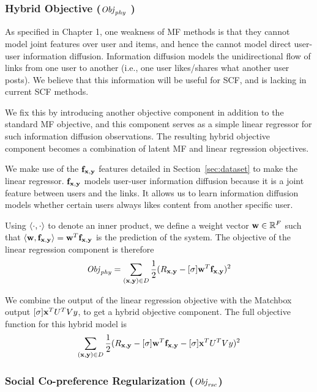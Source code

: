 \subsubsection{Hybrid Objective ($\mathit{Obj}_{\mathit{phy}}$ )}

As specified in Chapter 1, one weakness of MF methods is that they
cannot model joint features over user and items, and hence the cannot
model direct user-user information diffusion. Information diffusion
models the unidirectional flow of links from one user to another
(i.e., one user likes/shares what another user posts). We believe that
this information will be useful for SCF, and is lacking in current SCF
methods.

We fix this by introducing another objective component in addition to
the standard MF objective, and this component serves as a simple
linear regressor for such information diffusion observations. The
resulting hybrid objective component becomes a combination of latent
MF and linear regression objectives.

We make use of the $\mathbf{f}_{\mathbf{x},\mathbf{y}}$ features detailed in
Section~\ref{sec:dataset} to make the linear regressor. $\mathbf{f}_{\mathbf{x},\mathbf{y}}$
models user-user information diffusion because it is a joint feature
between users and the links. It allows us to learn information
diffusion models whether certain users always likes content from
another specific user.


Using $\langle \cdot,\cdot \rangle$ to denote an inner product, we define a
weight vector $\mathbf{w} \in \mathbb{R}^F$ such that $\langle \mathbf{w}, \mathbf{f}_{\mathbf{x},\mathbf{y}} \rangle = \mathbf{w}^T
\mathbf{f}_{\mathbf{x},\mathbf{y}}$ is the prediction of the system.  The objective of the
linear regression component is therefore
\begin{align*}
\mathit{Obj}_{\mathit{phy}} = \sum_{(\mathbf{x},\mathbf{y}) \in D} \frac{1}{2} (R_{\mathbf{x},\mathbf{y}} - [\sigma] \mathbf{w}^T \mathbf{f}_{\mathbf{x},\mathbf{y}})^2
\end{align*}

We combine the output of the linear regression objective with the
Matchbox output $[\sigma] \mathbf{x}^T U^T V y$, to get a hybrid objective
component. The full objective function for this hybrid model is
\begin{align}
\sum_{(\mathbf{x},\mathbf{y}) \in D} \frac{1}{2} (R_{\mathbf{x},\mathbf{y}} - [\sigma] \mathbf{w}^T \mathbf{f}_{\mathbf{x},\mathbf{y}} - [\sigma] \mathbf{x}^T U^T V y)^2
\end{align}

\subsubsection{Social Co-preference Regularization ($\mathit{Obj}_{\mathit{rsc}}$)}
\label{sec:rsc}

